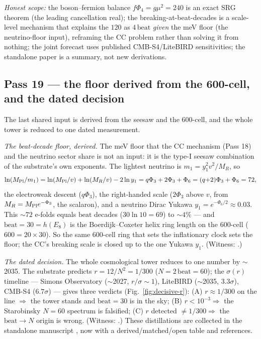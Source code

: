 \documentclass[11pt]{article}
\begin{document}
\emph{Honest scope:} the boson--fermion balance $f\Phi_4=g\mu^2=240$ is an exact SRG theorem
(the leading cancellation real); the breaking-at-beat-decades is a scale-level mechanism that
explains the $120$ as $4\,\mathrm{beat}$ \emph{given} the meV floor (the neutrino-floor input),
reframing the CC problem rather than solving it from nothing; the joint forecast uses published
CMB-S4/LiteBIRD sensitivities; the standalone paper is a summary, not new derivations.

\subsection{Pass 19 --- the floor derived from the 600-cell, and the dated decision}
\label{sec:capstone-nineteen}

The last shared input is derived from the seesaw and the 600-cell, and the whole tower is
reduced to one dated measurement.

\emph{The beat-decade floor, derived.} The meV floor that the CC mechanism (Pass 18) and the
neutrino sector share is not an input: it is the type-I seesaw combination of the substrate's
own exponents. The lightest neutrino is $m_1=y_1^2v^2/M_R$, so
\[
\ln(M_{\rm Pl}/m_1)=\ln(M_{\rm Pl}/v)+\ln(M_R/v)-2\ln y_1=q\Phi_3+2\Phi_3+\Phi_6=(q{+}2)\Phi_3+\Phi_6=72,
\]
the electroweak descent ($q\Phi_3$), the right-handed scale ($2\Phi_3$ above $v$, from $M_R=
M_{\rm Pl}e^{-\Phi_3}$, the scalaron), and a neutrino Dirac Yukawa $y_1=e^{-\Phi_6/2}\approx0.03$.
This $\sim72$ e-folds equals $\mathrm{beat}$ decades ($30\ln10=69$) to $\sim4\%$ --- and
$\mathrm{beat}=30=h(E_8)$ is the Boerdijk--Coxeter helix ring length on the $600$-cell
($600=20\times30$). So the same $600$-cell ring that sets the inflationary clock sets the
floor; the CC's breaking scale is closed up to the one Yukawa $y_1$. (Witness:
.)

\emph{The dated decision.} The whole cosmological tower reduces to one number by $\sim$2035.
The substrate predicts $r=12/N^2=1/300$ ($N=2\,\mathrm{beat}=60$); the $\sigma(r)$ timeline ---
Simons Observatory ($\sim$2027, $r/\sigma\!\sim\!1$), LiteBIRD ($\sim$2035, $3.3\sigma$), CMB-S4
($6.7\sigma$) --- gives three verdicts (Fig.~\ref{fig:decisive-r}): (A) $r\approx1/300$ on the
line $\Rightarrow$ the tower stands and $\mathrm{beat}=30$ is in the sky; (B) $r<10^{-3}
\Rightarrow$ the Starobinsky $N=60$ spectrum is falsified; (C) $r$ detected $\neq1/300
\Rightarrow$ the $\mathrm{beat}\to N$ origin is wrong. (Witness:
.) These distillations are collected in the standalone
manuscript , now with a derived/matched/open table and references.
\end{document}
